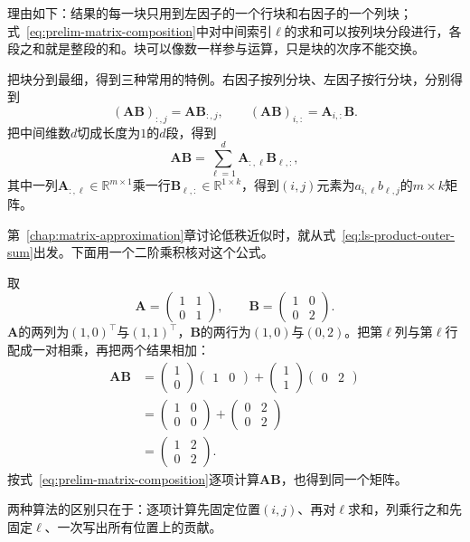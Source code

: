 理由如下：结果的每一块只用到左因子的一个行块和右因子的一个列块；式~\eqref{eq:prelim-matrix-composition}中对中间索引$\ell$的求和可以按列块分段进行，各段之和就是整段的和。块可以像数一样参与运算，只是块的次序不能交换。

把块分到最细，得到三种常用的特例。右因子按列分块、左因子按行分块，分别得到
\[
 (\bm A\bm B)_{:,j}=\bm A\bm B_{:,j},\qquad
 (\bm A\bm B)_{i,:}=\bm A_{i,:}\bm B.
\]
把中间维数$d$切成长度为$1$的$d$段，得到
\begin{equation}
 \bm A\bm B=\sum_{\ell=1}^d\bm A_{:,\ell}\bm B_{\ell,:},
 \label{eq:ls-product-outer-sum}
\end{equation}
其中一列$\bm A_{:,\ell}\in\mathbb R^{m\times1}$乘一行$\bm B_{\ell,:}\in\mathbb R^{1\times k}$，得到$(i,j)$元素为$a_{i,\ell}b_{\ell,j}$的$m\times k$矩阵。

第~\ref{chap:matrix-approximation}章讨论低秩近似时，就从式~\eqref{eq:ls-product-outer-sum}出发。下面用一个二阶乘积核对这个公式。
\begin{example}[把乘积写成列乘行之和]
\label{ex:ls-product-as-outer-sum}
取
\[
\bm A=\begin{pmatrix}1&1\\0&1\end{pmatrix},\qquad
\bm B=\begin{pmatrix}1&0\\0&2\end{pmatrix}.
\]
$\bm A$的两列为$(1,0)^\top$与$(1,1)^\top$，$\bm B$的两行为$(1,0)$与$(0,2)$。把第$\ell$列与第$\ell$行配成一对相乘，再把两个结果相加：
\[
 \begin{aligned}
 \bm A\bm B
 &=\begin{pmatrix}1\\0\end{pmatrix}\begin{pmatrix}1&0\end{pmatrix}+\begin{pmatrix}1\\1\end{pmatrix}\begin{pmatrix}0&2\end{pmatrix}\\
 &=\begin{pmatrix}1&0\\0&0\end{pmatrix}+\begin{pmatrix}0&2\\0&2\end{pmatrix}\\
 &=\begin{pmatrix}1&2\\0&2\end{pmatrix}.
 \end{aligned}
\]
按式~\eqref{eq:prelim-matrix-composition}逐项计算$\bm A\bm B$，也得到同一个矩阵。

两种算法的区别只在于：逐项计算先固定位置$(i,j)$、再对$\ell$求和，列乘行之和先固定$\ell$、一次写出所有位置上的贡献。
\end{example}

